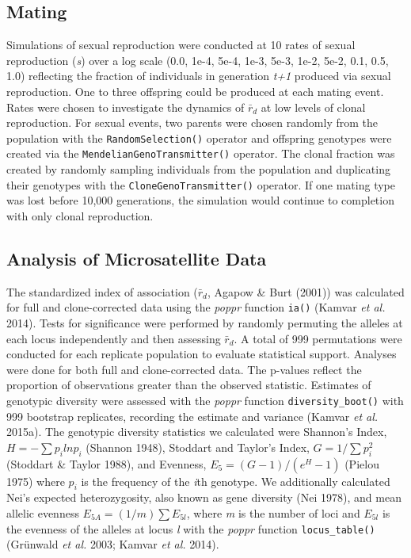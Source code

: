 \documentclass[]{article}
\theoremstyle{definition}
\theoremstyle{definition}
\theoremstyle{definition}
\theoremstyle{remark}
\begin{document}
\subsection{Mating}\label{mating}

Simulations of sexual reproduction were conducted at 10 rates of sexual
reproduction (\emph{s}) over a log scale (0.0, 1e-4, 5e-4, 1e-3, 5e-3,
1e-2, 5e-2, 0.1, 0.5, 1.0) reflecting the fraction of individuals in
generation \emph{t+1} produced via sexual reproduction. One to three
offspring could be produced at each mating event. Rates were chosen to
investigate the dynamics of \(\bar{r}_d\) at low levels of clonal
reproduction. For sexual events, two parents were chosen randomly from
the population with the \texttt{RandomSelection()} operator and
offspring genotypes were created via the
\texttt{MendelianGenoTransmitter()} operator. The clonal fraction was
created by randomly sampling individuals from the population and
duplicating their genotypes with the \texttt{CloneGenoTransmitter()}
operator. If one mating type was lost before 10,000 generations, the
simulation would continue to completion with only clonal reproduction.

\subsection{Analysis of Microsatellite
Data}\label{analysis-of-microsatellite-data}

The standardized index of association (\(\bar{r}_d\), Agapow \& Burt
(2001)) was calculated for full and clone-corrected data using the
\emph{poppr} function \texttt{ia()} (Kamvar \emph{et al.} 2014). Tests
for significance were performed by randomly permuting the alleles at
each locus independently and then assessing \(\bar{r}_d\). A total of
999 permutations were conducted for each replicate population to
evaluate statistical support. Analyses were done for both full and
clone-corrected data. The p-values reflect the proportion of
observations greater than the observed statistic. Estimates of genotypic
diversity were assessed with the \emph{poppr} function
\texttt{diversity\_boot()} with 999 bootstrap replicates, recording the
estimate and variance (Kamvar \emph{et al.} 2015a). The genotypic
diversity statistics we calculated were Shannon's Index,
\(H = -\sum p_i ln p_i\) (Shannon 1948), Stoddart and Taylor's Index,
\(G = 1/\sum p_i^2\) (Stoddart \& Taylor 1988), and Evenness,
\(E_5 = (G - 1)/(e^H - 1)\) (Pielou 1975) where \(p_i\) is the frequency
of the \emph{i}th genotype. We additionally calculated Nei's expected
heterozygosity, also known as gene diversity (Nei 1978), and mean
allelic evenness \(E_{5A} = (1/m) \sum E_{5l}\), where \emph{m} is the
number of loci and \(E_{5l}\) is the evenness of the alleles at locus
\emph{l} with the \emph{poppr} function \texttt{locus\_table()}
(Grünwald \emph{et al.} 2003; Kamvar \emph{et al.} 2014).
\end{document}
